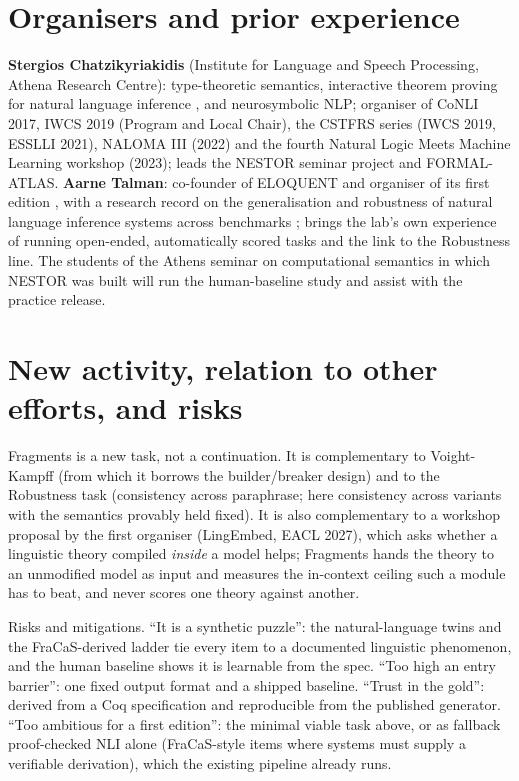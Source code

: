 \documentclass[10pt,a4paper]{article}
\begin{document}
\section{Organisers and prior experience}
\textbf{Stergios Chatzikyriakidis} (Institute for Language and Speech Processing, Athena Research Centre): type-theoretic semantics, interactive theorem proving for natural language inference \citep{chatzikyriakidis2014,chatzikyriakidis2020}, and neurosymbolic NLP; organiser of CoNLI 2017, IWCS 2019 (Program and Local Chair), the CSTFRS series (IWCS 2019, ESSLLI 2021), NALOMA III (2022) and the fourth Natural Logic Meets Machine Learning workshop (2023); leads the NESTOR seminar project and FORMAL-ATLAS. \textbf{Aarne Talman}: co-founder of ELOQUENT and organiser of its first edition \citep{karlgren2024eloquent}, with a research record on the generalisation and robustness of natural language inference systems across benchmarks \citep{talman2019generalization}; brings the lab's own experience of running open-ended, automatically scored tasks and the link to the Robustness line. The students of the Athens seminar on computational semantics in which NESTOR was built will run the human-baseline study and assist with the practice release.

\section{New activity, relation to other efforts, and risks}
Fragments is a new task, not a continuation. It is complementary to Voight-Kampff (from which it borrows the builder/breaker design) and to the Robustness task (consistency across paraphrase; here consistency across variants with the semantics provably held fixed). It is also complementary to a workshop proposal by the first organiser (LingEmbed, EACL 2027), which asks whether a linguistic theory compiled \emph{inside} a model helps; Fragments hands the theory to an unmodified model as input and measures the in-context ceiling such a module has to beat, and never scores one theory against another.

Risks and mitigations. ``It is a synthetic puzzle'': the natural-language twins and the FraCaS-derived ladder tie every item to a documented linguistic phenomenon, and the human baseline shows it is learnable from the spec. ``Too high an entry barrier'': one fixed output format and a shipped baseline. ``Trust in the gold'': derived from a Coq specification and reproducible from the published generator. ``Too ambitious for a first edition'': the minimal viable task above, or as fallback proof-checked NLI alone (FraCaS-style items where systems must supply a verifiable derivation), which the existing pipeline already runs.

{\small\setlength{\bibsep}{1pt}

}
\end{document}
